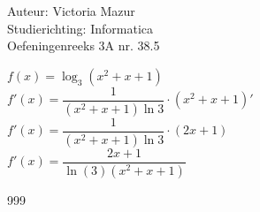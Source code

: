 \documentclass[a4paper]{article}
\begin{document}
  
\noindent \large Auteur: Victoria Mazur \\
\noindent \large Studierichting: Informatica\\
\noindent \large Oefeningenreeks 3A nr. 38.5\\

\medskip

\normalsize

$f(x) = \log_3(x^2 + x + 1)$ \\

$f'(x) = \dfrac{1}{(x^2 + x + 1) \ln 3} \cdot (x^2 + x + 1)'$ \\

$f'(x) = \dfrac{1}{(x^2 + x + 1) \ln 3} \cdot (2x + 1)$ \\

$f'(x) = \dfrac{2x + 1}{\ln(3)(x^2 + x + 1)}$ \\

\begin{thebibliography}{999}
\end{thebibliography}
\end{document}
